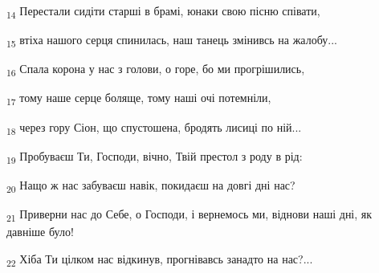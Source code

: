 \begin{tcolorbox}
\textsubscript{14} Перестали сидіти старші в брамі, юнаки свою пісню співати,
\end{tcolorbox}
\begin{tcolorbox}
\textsubscript{15} втіха нашого серця спинилась, наш танець змінивсь на жалобу...
\end{tcolorbox}
\begin{tcolorbox}
\textsubscript{16} Спала корона у нас з голови, о горе, бо ми прогрішились,
\end{tcolorbox}
\begin{tcolorbox}
\textsubscript{17} тому наше серце боляще, тому наші очі потемніли,
\end{tcolorbox}
\begin{tcolorbox}
\textsubscript{18} через гору Сіон, що спустошена, бродять лисиці по ній...
\end{tcolorbox}
\begin{tcolorbox}
\textsubscript{19} Пробуваєш Ти, Господи, вічно, Твій престол з роду в рід:
\end{tcolorbox}
\begin{tcolorbox}
\textsubscript{20} Нащо ж нас забуваєш навік, покидаєш на довгі дні нас?
\end{tcolorbox}
\begin{tcolorbox}
\textsubscript{21} Приверни нас до Себе, о Господи, і вернемось ми, віднови наші дні, як давніше було!
\end{tcolorbox}
\begin{tcolorbox}
\textsubscript{22} Хіба Ти цілком нас відкинув, прогнівавсь занадто на нас?...
\end{tcolorbox}
